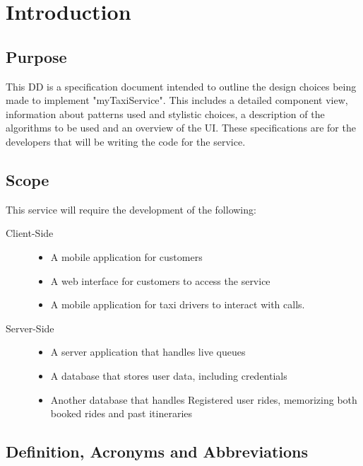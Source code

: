 \section{Introduction}

\subsection{Purpose}
	This DD is a specification document intended to outline the design choices being made to implement "myTaxiService". This includes a detailed component view, information about 
	patterns used and stylistic choices, a description of the algorithms to be used and an overview of the UI. These specifications are for the developers that will be writing the code
	for the service.
\subsection{Scope}
	This service will require the development of the following:
	\begin{description}
		\item[Client-Side] \hfill
			\begin{itemize}
				\item A mobile application for customers
				\item A web interface for customers to access the service
				\item A mobile application for taxi drivers to interact with calls.
			\end{itemize}
		\item[Server-Side] \hfill
			\begin{itemize}
				\item A server application that handles live queues
				\item A database that stores user data, including credentials
				\item Another database that handles Registered user rides, memorizing both booked rides and past itineraries
			\end{itemize}
	\end{description}
\subsection{Definition, Acronyms and Abbreviations}

